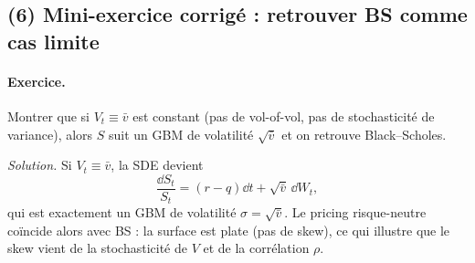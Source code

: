 \subsection*{(6) Mini-exercice corrigé : retrouver BS comme cas limite}
\paragraph{Exercice.}
Montrer que si $V_t\equiv \bar v$ est constant (pas de vol-of-vol, pas de stochasticité de variance), alors $S$ suit un GBM de volatilité $\sqrt{\bar v}$ et on retrouve Black--Scholes.

\emph{Solution.}
Si $V_t\equiv\bar v$, la SDE devient
\[
\frac{\dd S_t}{S_t}=(r-q)\dd t+\sqrt{\bar v}\,\dd W_t,
\]
qui est exactement un GBM de volatilité $\sigma=\sqrt{\bar v}$.
Le pricing risque-neutre coïncide alors avec BS : la surface est plate (pas de skew), ce qui illustre que le skew vient de la stochasticité de $V$ et de la corrélation $\rho$.
